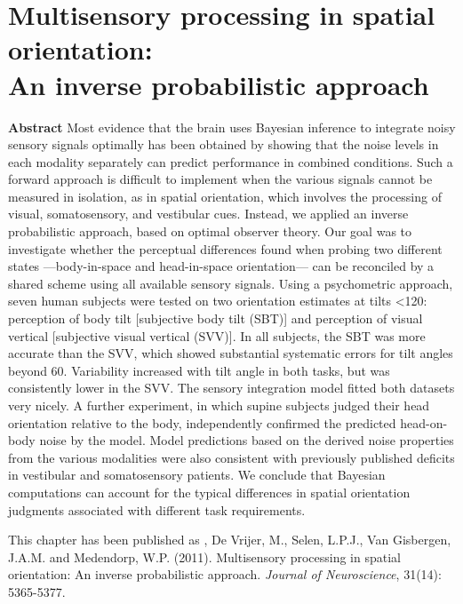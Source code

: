 
\thispagestyle{empty}

\chapter{Multisensory processing in spatial orientation:\\An inverse probabilistic approach}
\chaptermark{}

\newpage

\small {\bf Abstract} Most evidence that the brain uses Bayesian inference to integrate noisy sensory signals optimally has been obtained by showing that the noise levels in each modality separately can predict performance in combined conditions. Such a forward approach is difficult to implement when the various signals cannot be measured in isolation, as in spatial orientation, which involves the processing of visual, somatosensory, and vestibular cues. Instead, we applied an inverse probabilistic approach, based on optimal observer theory. Our goal was to investigate whether the perceptual differences found when probing two different states ---body-in-space and head-in-space orientation--- can be reconciled by a shared scheme using all available sensory signals. Using a psychometric approach, seven human subjects were tested on two orientation estimates at tilts \textless 120\textdegree: perception of body tilt [subjective body tilt (SBT)] and perception of visual vertical [subjective visual vertical (SVV)]. In all subjects, the SBT was more accurate than the SVV, which showed substantial systematic errors for tilt angles beyond 60\textdegree. Variability increased with tilt angle in both tasks, but was consistently lower in the SVV. The sensory integration model fitted both datasets very nicely. A further experiment, in which supine subjects judged their head orientation relative to the body, independently confirmed the predicted head-on-body noise by the model. Model predictions based on the derived noise properties from the various modalities were also consistent with previously published deficits in vestibular and somatosensory patients. We conclude that Bayesian computations can account for the typical differences in spatial orientation judgments associated with different task requirements.

\vfill

\noindent\underline{ \hspace{4cm} }

\noindent This chapter has been published as \newline
{}, De Vrijer, M., Selen, L.P.J., Van Gisbergen, J.A.M. and Medendorp, W.P. (2011). Multisensory processing in spatial orientation: An inverse probabilistic approach. \emph{Journal of Neuroscience}, 31(14): 5365-5377. \newline

\newpage





